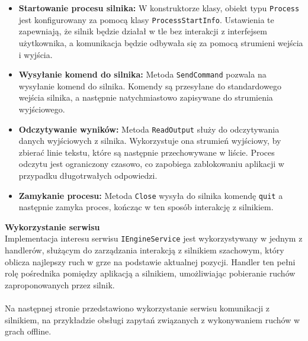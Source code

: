 \documentclass[twoside]{projektInzynierskiMS1}
\begin{document}
\begin{itemize} 
    \item \textbf{Startowanie procesu silnika:} W konstruktorze klasy, obiekt typu \texttt{Process} jest konfigurowany za pomocą klasy \texttt{ProcessStartInfo}. Ustawienia te zapewniają, że silnik będzie działał w tle bez interakcji z interfejsem użytkownika, a komunikacja będzie odbywała się za pomocą strumieni wejścia i wyjścia. 
    \item \textbf{Wysyłanie komend do silnika:} Metoda \texttt{SendCommand} pozwala na wysyłanie komend do silnika. Komendy są przesyłane do standardowego wejścia silnika, a następnie natychmiastowo zapisywane do strumienia wyjściowego. 
    \item \textbf{Odczytywanie wyników:} Metoda \texttt{ReadOutput} służy do odczytywania danych wyjściowych z silnika. Wykorzystuje ona strumień wyjściowy, by zbierać linie tekstu, które są następnie przechowywane w liście. Proces odczytu jest ograniczony czasowo, co zapobiega zablokowaniu aplikacji w przypadku długotrwałych odpowiedzi. 
    \item \textbf{Zamykanie procesu:} Metoda \texttt{Close} wysyła do silnika komendę \texttt{quit} a następnie zamyka proces, kończąc w ten sposób interakcję z silnikiem. 
\end{itemize}


\noindent \textbf{Wykorzystanie serwisu}\\
Implementacja interesu serwisu \texttt{IEngineService} jest wykorzystywany w jednym z handlerów, służącym do zarządzania interakcją z silnikiem szachowym, który oblicza najlepszy ruch w grze na podstawie aktualnej pozycji. Handler ten pełni rolę pośrednika pomiędzy aplikacją a silnikiem, umożliwiając pobieranie ruchów zaproponowanych przez silnik.
\\\\
Na następnej stronie przedstawiono wykorzystanie serwisu komunikacji z silnikiem, na przykładzie obsługi zapytań związanych z wykonywaniem ruchów w grach offline.

\newpage
\end{document}
